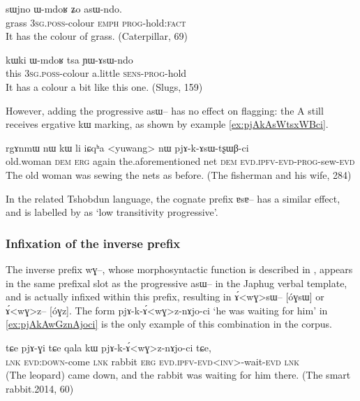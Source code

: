 \documentclass[oldfontcommands,oneside,a4paper,11pt]{article}
\newcommand{\ipa}[1]{{\phon \mbox{#1}}} %
\newcommand{\factual}[1]{\textsc{:fact}}
\begin{document}
\begin{exe}
\ex \label{ex:asWndo}
\gll
\ipa{sɯjno} 	\ipa{ɯ-mdoʁ} 	\ipa{ʑo} 	\ipa{asɯ-ndo.} \\
grass \textsc{3sg.poss}-colour \textsc{emph} \textsc{prog}-hold\factual{} \\
\glt It has the colour of grass. (Caterpillar, 69)
\end{exe}


\begin{exe}
\ex \label{ex:YAsWndo}
\gll
\ipa{kɯki} 	\ipa{ɯ-mdoʁ} 	\ipa{tsa} 	\ipa{ɲɯ-ɤsɯ-ndo} \\
this  \textsc{3sg.poss}-colour  a.little \textsc{sens-prog}-hold \\
\glt It has a colour a bit like this one. (Slugs, 159)
\end{exe}

However, adding the progressive \ipa{asɯ--} has no effect on flagging: the A still receives ergative \ipa{kɯ} marking, as shown by example \ref{ex:pjAkAsWtsxWBci}.

\begin{exe}
\ex \label{ex:pjAkAsWtsxWBci}
\gll
\ipa{rgɤnmɯ}  	\ipa{nɯ}  	\ipa{kɯ}  	\ipa{li}  	\ipa{iɕqʰa}  	<yuwang>	\ipa{nɯ}  	\ipa{pjɤ-k-ɤsɯ-tʂɯβ-ci}  		\\
old.woman \textsc{dem} \textsc{erg} again the.aforementioned net \textsc{dem} \textsc{evd.ipfv-evd-prog}-sew-\textsc{evd} \\
\glt The old woman was sewing the nets as before. (The fisherman and his wife, 284)
\end{exe}


In the related Tshobdun language, the cognate prefix \ipa{ɐsɐ--} has a similar effect, and is labelled by \citet{jackson03caodeng} as `low transitivity progressive'.

\subsubsection{Infixation of the inverse prefix}
The inverse prefix \ipa{wɣ--}, whose morphosyntactic function is described in \citet{jacques10inverse}, appears in the same prefixal slot as the progressive \ipa{asɯ--} in the Japhug verbal template, and is actually infixed within this prefix, resulting in \ipa{ɤ́<wɣ>sɯ--} [\ipa{óɣsɯ}] or \ipa{ɤ́<wɣ>z--} [\ipa{óɣz}]. The form \ipa{pjɤ-k-ɤ́<wɣ>z-nɤjo-ci} `he was waiting for him' in \ref{ex:pjAkAwGznAjoci} is the only example of this combination in the corpus.


\begin{exe}
\ex \label{ex:pjAkAwGznAjoci}
\gll
\ipa{tɕe} 	\ipa{pjɤ-ɣi} 	\ipa{tɕe} 	\ipa{qala} 	\ipa{kɯ} 	\ipa{pjɤ-k-ɤ́<wɣ>z-nɤjo-ci} 	\ipa{tɕe,} \\
\textsc{lnk} \textsc{evd:down}-come \textsc{lnk} rabbit \textsc{erg} \textsc{evd.ipfv-evd<inv>}-wait-\textsc{evd} \textsc{lnk} \\
\glt (The leopard) came down, and the rabbit was waiting for him there. (The smart rabbit.2014, 60)
\end{exe}
\end{document}
